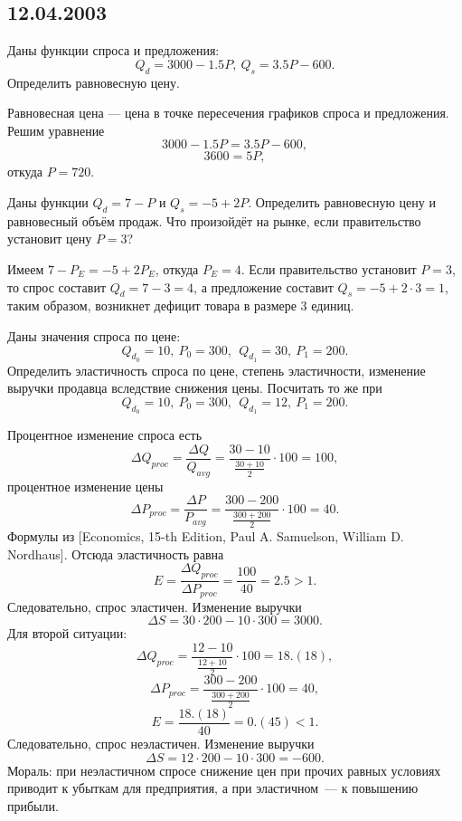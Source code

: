 \documentclass[a4paper]{article}
\begin{document}
\subsection*{12.04.2003}

\begin{problem}
Даны функции спроса и предложения:
$$Q_d=3000-1.5P,~Q_s=3.5P-600.$$ Определить равновесную цену.
\end{problem}
\begin{solution}
Равновесная цена --- цена в точке пересечения графиков спроса и
предложения. Решим уравнение
$$3000-1.5P=3.5P-600,$$ $$3600=5P,$$
откуда $P=720$.
\end{solution}

\begin{problem}
Даны функции $Q_d=7-P$ и $Q_s=-5+2P$. Определить равновесную цену и
равновесный объём продаж. Что произойдёт на рынке, если
правительство установит цену $P=3$?
\end{problem}
\begin{solution}
Имеем $7-P_E=-5+2P_E$, откуда $P_E=4$. Если правительство установит
$P=3$, то спрос составит $Q_d=7-3=4$, а предложение составит $Q_s=-5+2\cdot 3=1$,
таким образом, возникнет дефицит товара в размере 3 единиц.
\end{solution}

\begin{problem}
Даны значения спроса по цене:
$$Q_{d_0}=10,~P_0=300,~~Q_{d_1}=30,~P_1=200.$$ Определить
эластичность спроса по цене, степень эластичности, изменение
выручки продавца вследствие снижения цены. Посчитать то же при
$$Q_{d_0}=10,~P_0=300,~~Q_{d_1}=12,~P_1=200.$$
\end{problem}
\begin{solution}
Процентное изменение спроса есть
$$\Delta Q_{proc}=\frac{\Delta Q}{Q_{avg}}=\frac{30-10}{\frac{30+10}{2}}\cdot 100=100,$$
процентное изменение цены
$$\Delta P_{proc}=\frac{\Delta P}{P_{avg}}=\frac{300-200}{\frac{300+200}{2}}\cdot 100=40.$$
Формулы из [Economics, 15-th Edition, Paul A. Samuelson, William D. Nordhaus].
Отсюда эластичность равна $$E=\frac{\Delta Q_{proc}}{\Delta P_{proc}}=\frac{100}{40}=2.5>1.$$
Следовательно, спрос эластичен. Изменение выручки $$\Delta S = 30 \cdot 200 - 10 \cdot 300 = 3000.$$
Для второй ситуации:
$$\Delta Q_{proc}=\frac{12-10}{\frac{12+10}{2}}\cdot 100= 18.(18),$$
$$\Delta P_{proc}=\frac{300-200}{\frac{300+200}{2}}\cdot 100=40,$$
$$E=\frac{18.(18)}{40}=0.(45)<1.$$
Следовательно, спрос неэластичен. Изменение выручки $$\Delta S = 12 \cdot 200 - 10 \cdot 300 = -600.$$
Мораль: при неэластичном спросе снижение цен при прочих равных условиях приводит к убыткам
для предприятия, а при эластичном~--- к повышению прибыли.
\end{solution}
\end{document}
